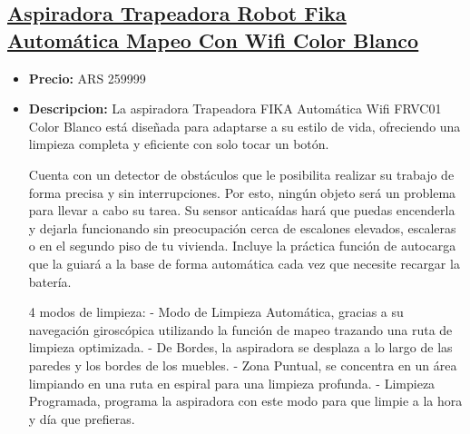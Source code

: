 \documentclass{article}
\begin{document}
    
    \begin{adjustwidth}{2em}{}

    \subsection{\underline{\href{https://www.mercadolibre.com.ar/aspiradora-trapeadora-robot-fika-automatica-mapeo-con-wifi-color-blanco/p/MLA29751097}{Aspiradora Trapeadora Robot Fika Automática Mapeo Con Wifi Color Blanco}}}
    \begin{itemize}
        \item \textbf{Precio:} ARS 259999
        \item \textbf{Descripcion:} La aspiradora Trapeadora FIKA Automática Wifi FRVC01 Color Blanco está diseñada para adaptarse a su estilo de vida, ofreciendo una limpieza completa y eficiente con solo tocar un botón.

Cuenta con un detector de obstáculos que le posibilita realizar su trabajo de forma precisa y sin interrupciones. Por esto, ningún objeto será un problema para llevar a cabo su tarea. 
Su sensor anticaídas hará que puedas encenderla y dejarla funcionando sin preocupación cerca de escalones elevados, escaleras o en el segundo piso de tu vivienda. 
Incluye la práctica función de autocarga que la guiará a la base de forma automática cada vez que necesite recargar la batería.

4 modos de limpieza: 
- Modo de Limpieza Automática, gracias a su navegación giroscópica utilizando la función de mapeo trazando una ruta de limpieza optimizada.
- De Bordes, la aspiradora se desplaza a lo largo de las paredes y los bordes de los muebles. 
- Zona Puntual, se concentra en un área limpiando en una ruta en espiral para una limpieza profunda.
- Limpieza Programada, programa la aspiradora con este modo para que limpie a la hora y día que prefieras. 


\end{itemize}
\end{adjustwidth}
\end{document}
